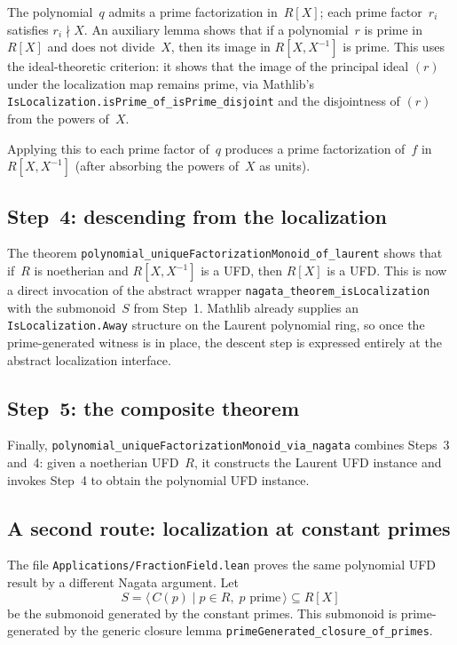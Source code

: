 \documentclass[11pt]{article}
\theoremstyle{plain}
\theoremstyle{definition}
\theoremstyle{remark}
\newcommand{\li}[1]{\texorpdfstring{\texttt{#1}}{#1}}
\newcommand{\lf}[1]{\texorpdfstring{\nolinkurl{#1}}{#1}}
\begin{document}
The polynomial~$q$ admits a prime factorization in~$R[X]$; each prime
factor~$r_i$ satisfies $r_i\nmid X$.  An auxiliary lemma shows that if a
polynomial~$r$ is prime in~$R[X]$ and does not divide~$X$, then its image
in $R[X,X^{-1}]$ is prime.  This uses the ideal-theoretic criterion: it shows
that the image of the principal ideal $(r)$ under the localization map remains
prime, via Mathlib's \li{IsLocalization.isPrime\_of\_isPrime\_disjoint} and the
disjointness of $(r)$ from the powers of~$X$.

Applying this to each prime factor of~$q$ produces a prime factorization of~$f$
in $R[X,X^{-1}]$ (after absorbing the powers of~$X$ as units).

\subsection{Step~4: descending from the localization}

The theorem \li{polynomial\_uniqueFactorizationMonoid\_of\_laurent} shows that
if~$R$ is noetherian and $R[X,X^{-1}]$ is a UFD, then $R[X]$ is a UFD.  This
is now a direct invocation of the abstract wrapper
\li{nagata\_theorem\_isLocalization} with the submonoid~$S$ from Step~1.
Mathlib already supplies an \li{IsLocalization.Away} structure on the Laurent
polynomial ring, so once the prime-generated witness is in place, the descent
step is expressed entirely at the abstract localization interface.

\subsection{Step~5: the composite theorem}

Finally, \li{polynomial\_uniqueFactorizationMonoid\_via\_nagata} combines
Steps~3 and~4: given a noetherian UFD~$R$, it constructs the Laurent UFD
instance and invokes Step~4 to obtain the polynomial UFD instance.

\subsection{A second route: localization at constant primes}

The file \lf{Applications/FractionField.lean} proves the same polynomial UFD
result by a different Nagata argument.  Let
\[
  S = \langle\, C(p) \mid p \in R,\; p \text{ prime}\,\rangle \subseteq R[X]
\]
be the submonoid generated by the constant primes.  This submonoid is
prime-generated by the generic closure lemma
\li{primeGenerated\_closure\_of\_primes}.
\end{document}
